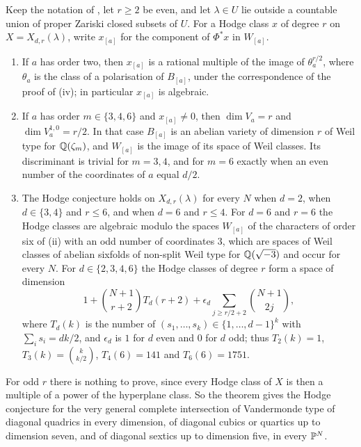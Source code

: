\begin{theorem}\label{thm:vgvandermonde}
Keep the notation of , let $r\ge2$ be even, and let
$\lambda\in U$ lie outside a countable union of proper Zariski closed
subsets of $U$. For a Hodge class $x$ of degree $r$ on $X=X_{d,r}(\lambda)$,
write $x_{[a]}$ for the component of $\Phi^{*}x$ in $W_{[a]}$.
\begin{enumerate}[label=\textup{(\roman*)},leftmargin=2.6em,itemsep=2pt]
\item If $a$ has order two, then $x_{[a]}$ is a rational multiple of the
  image of $\theta_{a}^{r/2}$, where $\theta_{a}$ is the class of a
  polarisation of $B_{[a]}$, under the correspondence of the proof of
  (iv); in particular $x_{[a]}$ is algebraic.
\item If $a$ has order $m\in\{3,4,6\}$ and $x_{[a]}\ne0$, then $\dim V_{a}=r$
  and $\dim V_{a}^{1,0}=r/2$. In that case $B_{[a]}$ is an abelian variety of
  dimension $r$ of Weil type for $\mathbb{Q}(\zeta_{m})$, and $W_{[a]}$ is the image
  of its space of Weil classes. Its discriminant is trivial for $m=3,4$, and
  for $m=6$ exactly when an even number of the coordinates of $a$ equal
  $d/2$.
\item The Hodge conjecture holds on $X_{d,r}(\lambda)$ for every $N$ when
  $d=2$, when $d\in\{3,4\}$ and $r\le6$, and when $d=6$ and $r\le4$. For
  $d=6$ and $r=6$ the Hodge classes are algebraic modulo the spaces
  $W_{[a]}$ of the characters of order six of (ii) with an odd number of
  coordinates $3$, which are spaces of Weil classes of abelian sixfolds of
  non-split Weil type for $\mathbb{Q}(\sqrt{-3})$ and occur for every $N$. For
  $d\in\{2,3,4,6\}$ the Hodge classes of degree $r$ form a space of dimension
  \[
    1+\binom{N+1}{r+2}T_{d}(r+2)+\epsilon_{d}\sum_{j\ge r/2+2}\binom{N+1}{2j},
  \]
  where $T_{d}(k)$ is the number of $(s_{1},\dots,s_{k})\in\{1,\dots,d-1\}^{k}$
  with $\sum_{i}s_{i}=dk/2$, and $\epsilon_{d}$ is $1$ for $d$ even and $0$ for
  $d$ odd; thus $T_{2}(k)=1$, $T_{3}(k)=\binom{k}{k/2}$, $T_{4}(6)=141$ and
  $T_{6}(6)=1751$.
\end{enumerate}
\end{theorem}

For odd $r$ there is nothing to prove, since every Hodge class of $X$ is
then a multiple of a power of the hyperplane class. So the theorem gives the
Hodge conjecture for the very general complete intersection of Vandermonde
type of diagonal quadrics in every dimension, of diagonal cubics or quartics
up to dimension seven, and of diagonal sextics up to dimension five, in
every $\mathbb{P}^{N}$.

